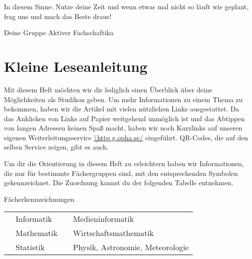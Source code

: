 In diesem Sinne: Nutze deine Zeit und wenn etwas mal nicht so läuft wie geplant, frag uns und mach das Beste draus!

Deine Gruppe Aktiver Fachschaftika

\chapter{Kleine Leseanleitung}

Mit diesem Heft möchten wir dir lediglich einen Überblick über deine Möglichkeiten als Studikon geben. Um mehr Informationen zu einem Thema zu bekommen, haben wir die Artikel mit vielen nützlichen Links ausgestattet. Da das Anklicken von Links auf Papier weitgehend unmöglich ist und das Abtippen von langen Adressen keinen Spaß macht, haben wir noch Kurzlinks auf unseren eigenen Weiterleitungsservice \url{\http g.opha.se/} eingeführt. QR-Codes, die auf den selben Service zeigen, gibt es auch.

Um dir die Orientierung in diesem Heft zu erleichtern haben wir Informationen, die nur für bestimmte Fächergruppen sind, mit den entsprechenden Symbolen gekennzeichnet. Die Zuordnung kannst du der folgenden Tabelle entnehmen.

\begin{table*}[h]
	\centering
	Fächerkennzeichnungen
	\begin{tabular}{ l l l l }
		\subjectI & Informatik  & \subjectMI & Medieninformatik \\[1.5mm]
		\subjectM & Mathematik   & \subjectW  & Wirtschaftsmathematik \\[1.5mm]
		\subjectS & Statistik    & \subjectP  & Physik, Astronomie, Meteorologie
	\end{tabular}
\end{table*}
